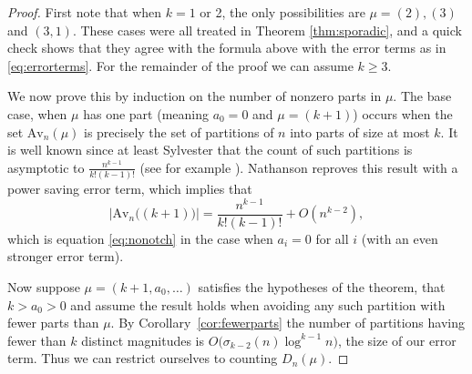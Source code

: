 \documentclass{article}
\theoremstyle{plain}
\theoremstyle{definition}
\newcommand{\Av}{\text{Av}}
\begin{document}
\begin{proof}
First note that when $k=1$ or 2, the only possibilities are $\mu=(2), (3)$ and $(3,1)$.  These cases were all treated in Theorem \ref{thm:sporadic}, and a quick check shows that they agree with the formula above with the error terms as in \eqref{eq:errorterms}.  For the remainder of the proof we can assume $k\geq 3.$

We now prove this by induction on the number of nonzero parts in $\mu$.
The base case, when $\mu$ has one part (meaning $a_0=0$ and $\mu=(k+1)$) occurs when the set $\Av_n(\mu)$ is precisely the set of partitions of $n$ into parts of size at most $k$.   It is well known since at least Sylvester that the count of such partitions is asymptotic to $\frac{n^{k-1}}{k!(k-1)!}$ (see for example \cite{Ramirez}).  Nathanson \cite{Nathanson} reproves this result with a power saving error term, which implies that 
\begin{equation*}
|\Av_n\big((k+1)\big)| = \frac{n^{k-1}}{k!(k-1)!} + O\left(n^{k-2}\right), 
\end{equation*} 
which is equation \eqref{eq:nonotch} in the case when $a_i=0$ for all $i$ (with an even stronger error term).

Now suppose $\mu=(k+1,a_0,\ldots)$ satisfies the hypotheses of the theorem, that $k>a_0>0$ and assume the result holds when avoiding any such partition with fewer parts than $\mu$.  By Corollary~\ref{cor:fewerparts} the number of partitions having fewer than $k$ distinct magnitudes is $O\big(\sigma_{k-2}(n)\log^{k-1}n \big)$, the size of our error term.  Thus we can restrict ourselves to counting $D_n(\mu)$.




\end{proof}
\end{document}

